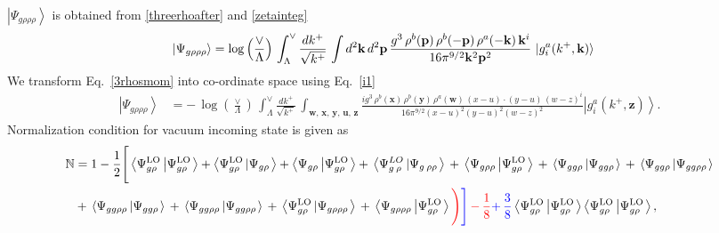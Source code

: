 \documentclass[aps,prd,amsmath,amssymb,nofootinbib]{revtex4-2}
\def\mf#1{\mathbb{#1}}
\numberwithin{equation}{section}
\begin{document}
$\left|\Psi_{g\rho\rho\rho}\right\rangle$ is obtained from \eqref{threerhoafter} and \eqref{zetainteg}
\begin{align}\label{3rhosmom}
    \left|\Psi_{g\rho\rho\rho}\right\rangle & = \log{\left(\frac{\vee}{\Lambda}\right)}\,\int_{\Lambda}^{\vee}\frac{dk^{+}}{\sqrt{k^{+}}}\,\int d^{2}\mathbf{k}\, d^{2}\mathbf{p}\,\frac{g^{3}\,\rho^{b}(\mathbf{p})\,\rho^{b}(-\mathbf{p})\,\rho^{a}(-\mathbf{k})\, \mathbf{k}^{i}}{16\pi^{9/2}\mathbf{k}^{2}\mathbf{p}^{2}}\, \ket{g^{a}_{i}(k^{+},\mathbf{k})}
\end{align}
We transform Eq.~\eqref{3rhosmom} into co-ordinate space using Eq.~\eqref{i1}
\begin{align}\label{3rhospos}
 \left|\Psi_{g\rho\rho\rho}\right\rangle & =  -\,\log{\left(\frac{\vee}{\Lambda}\right)}\,\int_{\Lambda}^{\vee}\frac{dk^{+}}{\sqrt{k^{+}}}\,\int_{\mathbf{w},\, \mathbf{x},\, \mathbf{y},\, \mathbf{u},\, \mathbf{z}}\frac{ig^{3}\,\rho^{b}(\mathbf{x})\,\rho^{b}(\mathbf{y})\,\rho^{a}(\mathbf{w})\, (x-u)\cdot (y-u)\,(w-z)^{i}}{16\pi^{9/2}(x-u)^{2}(y-u)^{2}(w-z)^{2}}\left|g_{i}^{a}(k^{+},\mathbf{z})\right\rangle .
\end{align}
Normalization condition for vacuum incoming state is given as
\begin{align}
    \mf{N} & = 1-\frac{1}{2}\Bigg[\left\langle \Psi_{g\rho}^{\text{LO}}\left|\Psi_{g\rho}^{\text{LO}}\right.\right\rangle + \left\langle \Psi_{g\rho}^{\text{LO}}\left|\Psi_{g\rho}\right.\right\rangle +\left\langle \Psi_{g\rho}\left|\Psi_{g\rho}^{\text{LO}}\right.\right\rangle +\,\left\langle \Psi_{g\:\rho}^{LO}\left|\Psi_{g\:\rho\rho}\right.\right\rangle \,+\,\left\langle \Psi_{g\rho\rho}\left|\Psi_{g\rho}^{\text{LO}}\right.\right\rangle \,+\,\left\langle \Psi_{gg\rho}\left|\Psi_{gg\rho}\right.\right\rangle \,+\,\left\langle \Psi_{gg\rho}\left|\Psi_{gg\rho\rho}\right.\right\rangle \notag \\ & +\,\left\langle \Psi_{gg\rho\rho}\left|\Psi_{gg\rho}\right.\right\rangle\,+\,\left\langle \Psi_{gg\rho\rho}\left|\Psi_{gg\rho\rho}\right.\right\rangle \,+\,\left\langle \Psi_{g\rho}^{\text{LO}}\left|\Psi_{g\rho\rho\rho}\right.\right\rangle \,+\,\left\langle \Psi_{g\rho\rho\rho}\left|\Psi_{g\rho}^{\text{LO}}\right.\right\rangle \textcolor{red}{\Bigg)}\textcolor{blue}{\Bigg]}\,\textcolor{red}{-\,\frac{1}{8}}\textcolor{blue}{+\,\frac{3}{8}}\left\langle \Psi_{g\rho}^{\text{LO}}\left|\Psi_{g\rho}^{\text{LO}}\right.\right\rangle \left\langle \Psi_{g\rho}^{\text{LO}}\left|\Psi_{g\rho}^{\text{LO}}\right.\right\rangle,
\end{align}
\end{document}
